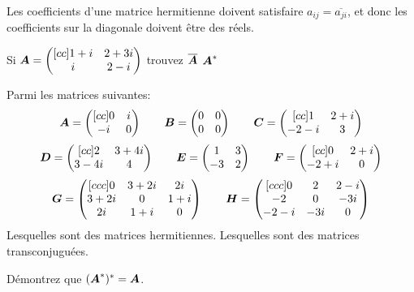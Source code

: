 Les coefficients d'une matrice hermitienne doivent satisfaire $a_{ij} = \overline{a_{ji}}$, et donc les coefficients sur
la diagonale doivent être des réels.

\begin{exerciceC}
Si $\boldsymbol{A} = \displaystyle \begin{pmatrix}[cc]
1+i & 2+3i \\
i & 2-i
\end{pmatrix}$ trouvez
 $\overline{\boldsymbol{A}}$
 $\boldsymbol{A}^*$
\end{exerciceC}
\begin{exerciceC}
Parmi les matrices suivantes:
\[
\boldsymbol{A} = \begin{pmatrix}[cc]
0 & i \\
-i & 0
\end{pmatrix}
\qquad
\boldsymbol{B} = \begin{pmatrix}
0 & 0 \\
0 & 0
\end{pmatrix}
\qquad
\boldsymbol{C} = \begin{pmatrix}[cc]
1 & 2+i \\
-2-i & 3
\end{pmatrix}
\]
\[
\boldsymbol{D} = \begin{pmatrix}[cc]
2 &3+4i \\
3-4i & 4
\end{pmatrix}
\qquad
\boldsymbol{E} = \begin{pmatrix}
1 & 3 \\
-3 & 2
\end{pmatrix}
\qquad
\boldsymbol{F} = \begin{pmatrix}[cc]
0 & 2+i \\
-2+i & 0
\end{pmatrix}
\]
\[
\boldsymbol{G} = \begin{pmatrix}[ccc]
0 & 3+2i & 2i \\
3+2i & 0 & 1+i \\
2i & 1+i & 0
\end{pmatrix}
\qquad
\boldsymbol{H} = \begin{pmatrix}[ccc]
0 & 2& 2-i \\
-2 & 0 & -3i \\
-2-i & -3i & 0
\end{pmatrix}
\]
 Lesquelles sont des matrices hermitiennes.
 Lesquelles sont des matrices transconjuguées.
\end{exerciceC}
\begin{exerciceC}
Démontrez que $(\boldsymbol{A}^*)^* = \boldsymbol{A}$.
\end{exerciceC}
